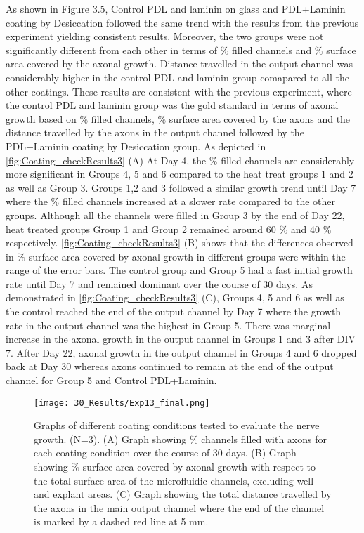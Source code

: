 \clearpage
As shown in Figure 3.5, Control PDL and laminin on glass and PDL+Laminin coating by Desiccation followed the same trend with the results from the previous experiment yielding consistent results. Moreover, the two groups were not significantly different from each other in terms of $\%$ filled channels and $\%$ surface area covered by the axonal growth. Distance travelled in the output channel was considerably higher in the control PDL and laminin group comapared to all the other coatings. These results are consistent with the previous experiment, where the control PDL and laminin group was the gold standard in terms of axonal growth based on $\%$ filled channels, $\%$ surface area covered by the axons and the distance travelled by the axons in the output channel followed by the PDL+Laminin coating by Desiccation group. As depicted in \ref{fig:Coating_checkResults3} (A) At Day 4, the $\%$ filled channels are considerably more significant in Groups 4, 5 and 6 compared to the heat treat groups 1 and 2 as well as Group 3. Groups 1,2 and 3 followed a similar growth trend until Day 7 where the $\%$ filled channels increased at a slower rate compared to the other groups. Although all the channels were filled in Group 3 by the end of Day 22, heat treated groups Group 1 and Group 2 remained around 60 $\%$ and 40 $\%$ respectively. \ref{fig:Coating_checkResults3} (B) shows that the differences observed in $\%$ surface area covered by axonal growth in different groups were within the range of the error bars. The control group and Group 5 had a fast initial growth rate until Day 7 and remained dominant over the course of 30 days. As demonstrated in \ref{fig:Coating_checkResults3} (C), Groups 4, 5 and 6 as well as the control reached the end of the output channel by Day 7 where the growth rate in the output channel was the highest in Group 5. There was marginal increase in the axonal growth in the output channel in Groups 1 and 3 after DIV 7. After Day 22, axonal growth in the output channel in Groups 4 and 6 dropped back at Day 30 whereas axons continued to remain at the end of the output channel for Group 5 and Control PDL+Laminin.
\begin{figure}[H]
\centering
\texttt{[image: 30\_Results/Exp13\_final.png]}
\caption{Graphs of different coating conditions tested to evaluate the nerve growth. (N=3). (A) Graph showing $\%$ channels filled with axons for each coating condition over the course of 30 days. (B) Graph showing $\%$ surface area covered by axonal growth with respect to the total surface area of the microfluidic channels, excluding well and explant areas. (C) Graph showing the total distance travelled by the axons in the main output channel where the end of the channel is marked by a dashed red line at 5 mm. }
\label{fig:CoatingResults2}
\end{figure}

